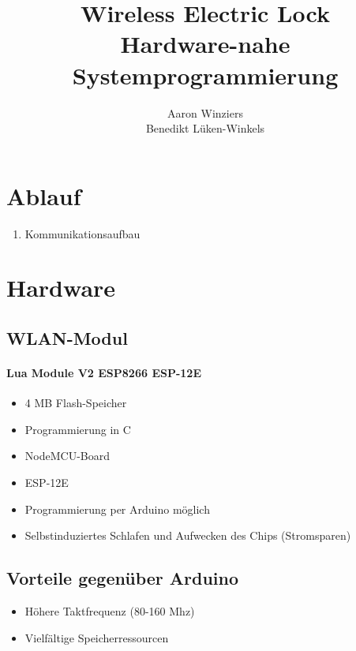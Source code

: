 \documentclass{scrartcl}
\title{Wireless Electric Lock\\ \small{Hardware-nahe Systemprogrammierung}}
\author{Aaron Winziers\\Benedikt Lüken-Winkels}
\begin{document}
\maketitle
\tableofcontents
\newpage

%
%

\section{Ablauf}

\begin{enumerate}
\item Kommunikationsaufbau
\end{enumerate}


%
%

\section{Hardware}\label{sec:hard}


\subsection{WLAN-Modul}

\paragraph{Lua Module V2 ESP8266 ESP-12E}
\begin{itemize}
\item 4 MB Flash-Speicher
\item Programmierung in C
\item NodeMCU-Board
\item ESP-12E
\item Programmierung per Arduino möglich
\item Selbstinduziertes Schlafen und Aufwecken des Chips (Stromsparen)
\end{itemize}



\subsection{Vorteile gegenüber Arduino}

\begin{itemize}
\item Höhere Taktfrequenz (80-160 Mhz)
\item Vielfältige Speicherressourcen
\end{itemize}
\end{document}
